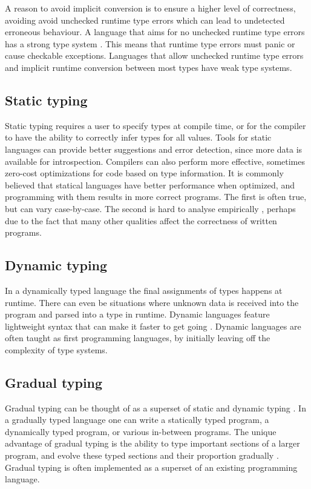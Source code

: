 A reason to avoid implicit conversion is to ensure a higher level of correctness, avoiding avoid unchecked runtime type errors which can lead to undetected erroneous behaviour. A language that aims for no unchecked runtime type errors has a strong type system \cite{cardelli_typeful_1989}. This means that runtime type errors must panic or cause checkable exceptions. Languages that allow unchecked runtime type errors and implicit runtime conversion between most types have weak type systems.

\subsection{Static typing}
Static typing requires a user to specify types at compile time, or for the compiler to have the ability to correctly infer types for all values. Tools for static languages can provide better suggestions and error detection, since more data is available for introspection. Compilers can also perform more effective, sometimes zero-cost optimizations for code based on type information. It is commonly believed that statical languages have better performance when optimized, and programming with them results in more correct programs. The first is often true, but can vary case-by-case. \cite{nanz_comparative_2015} The second is hard to analyse empirically \cite{codequality_reproudction_2019}, perhaps due to the fact that many other qualities affect the correctness of written programs. 

\subsection{Dynamic typing}
In a dynamically typed language the final assignments of types happens at runtime. There can even be situations where unknown data is received into the program and parsed into a type in runtime. Dynamic languages feature lightweight syntax that can make it faster to get going \cite{di_grazia_evolution_2022}. Dynamic languages are often taught as first programming languages, by initially leaving off the complexity of type systems.


\subsection{Gradual typing}
Gradual typing can be thought of as a superset of static and dynamic typing \cite{siek_refined_gradual_2015}. In a gradually typed language one can write a statically typed program, a dynamically typed program, or various in-between programs. The unique advantage of gradual typing is the ability to type important sections of a larger program, and evolve these typed sections and their proportion gradually \cite{siek_refined_gradual_2015}. Gradual typing is often implemented as a superset of an existing programming language.

